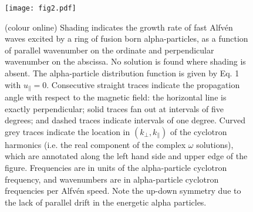 \documentclass[12pt]{iopart}
\begin{document}
\begin{figure}[ht!]
    \raggedleft
\texttt{[image: fig2.pdf]}
    \caption{(colour online) Shading indicates the growth rate of fast
    Alfv{\'e}n waves excited by a ring of fusion born alpha-particles, as a
    function of parallel wavenumber on the ordinate and perpendicular wavenumber
    on the abscissa. No solution is found where shading is absent. The
    alpha-particle distribution function is given by Eq. 1 with
    $u_{\parallel} = 0$. Consecutive straight traces indicate the propagation
    angle with respect to the magnetic field: the horizontal line is exactly
    perpendicular; solid traces fan out at intervals of five degrees; and dashed
    traces indicate intervals of one degree. Curved grey traces indicate the
    location in $(k_\perp, k_\parallel)$ of the cyclotron harmonics (i.e. the
    real component of the complex $\omega$ solutions), which are annotated along
    the left hand side and upper edge of the figure. Frequencies are in units of
    the alpha-particle cyclotron frequency, and wavenumbers are in
    alpha-particle cyclotron frequencies per Alfv{\'e}n speed. Note the up-down
    symmetry due to the lack of parallel drift in the energetic alpha
    particles.}
    \label{fig:2D_imag_zeropitch}
\end{figure}
\end{document}
